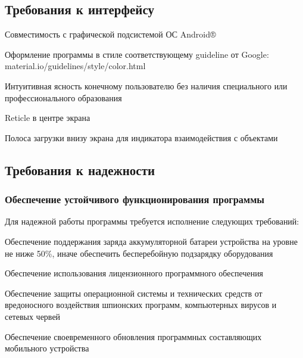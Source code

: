 \subsection{Требования к интерфейсу}
\begin{my_enumerate}
    \item Совместимость с графической подсистемой ОС Android®
    \item Оформление программы в стиле соответствующему guideline от Google:\\ material.io/guidelines/style/color.html
    \item Интуитивная ясность конечному пользователю без наличия специального или профессионального образования
    \item Reticle в центре экрана
    \item Полоса загрузки внизу экрана для индикатора взаимодействия с объектами
\end{my_enumerate}

\subsection{Требования к надежности}
\subsubsection{Обеспечение устойчивого функционирования программы}
Для надежной работы программы требуется исполнение следующих требований:
\begin{my_enumerate}
    \item Обеспечение поддержания заряда аккумуляторной батареи устройства на уровне не ниже 50\%, иначе обеспечить бесперебойную подзарядку оборудования
    \item Обеспечение использования лицензионного программного обеспечения
    \item Обеспечение защиты операционной системы и технических средств от вредоносного воздействия шпионских программ, компьютерных вирусов и сетевых червей
    \item Обеспечение своевременного обновления программных составляющих мобильного устройства
\end{my_enumerate}